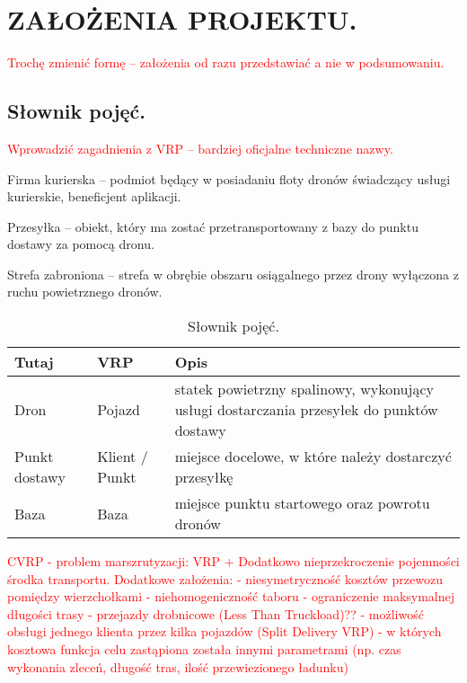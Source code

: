 \documentclass[twoside, 12pt]{article}
\begin{document}
\section{ZAŁOŻENIA PROJEKTU.}
\textcolor{red}{Trochę zmienić formę – założenia od razu przedstawiać a nie w podsumowaniu.}


\subsection{Słownik pojęć.}
\textcolor{red}{Wprowadzić zagadnienia z VRP – bardziej oficjalne techniczne nazwy.}
\par Firma kurierska – podmiot będący w posiadaniu floty dronów świadczący usługi kurierskie, beneficjent aplikacji.
\par Przesyłka – obiekt, który ma zostać przetransportowany z bazy do punktu dostawy za pomocą dronu.
\par Strefa zabroniona – strefa w obrębie obszaru osiągalnego przez drony wyłączona z ruchu powietrznego dronów.

\begin{table}[h]
	\centering
		\begin{tabular}{|l|l|p{7cm}|}
		\hline Tutaj & VRP & Opis\\
		\hline Dron & Pojazd & statek powietrzny spalinowy, wykonujący usługi dostarczania przesyłek do punktów dostawy\\
		\hline Punkt dostawy & Klient / Punkt & miejsce docelowe, w które należy dostarczyć przesyłkę\\
		\hline Baza & Baza & miejsce punktu startowego oraz powrotu dronów\\
		\hline
	\end{tabular}
	\caption{Słownik pojęć.}
\end{table}

\textcolor{red}{CVRP - problem marszrutyzacji:
VRP + Dodatkowo nieprzekroczenie pojemności środka transportu.
Dodatkowe założenia:
- niesymetryczność kosztów przewozu pomiędzy wierzchołkami
- niehomogeniczność taboru
- ograniczenie maksymalnej długości trasy
-  przejazdy drobnicowe (Less Than Truckload)??
- możliwość obsługi jednego klienta przez kilka pojazdów (Split Delivery VRP)
- w których kosztowa funkcja celu zastąpiona została innymi parametrami (np. czas wykonania zleceń, długość tras, ilość przewiezionego ładunku) 
}
\end{document}
